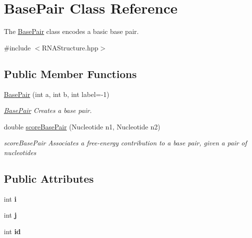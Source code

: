 \hypertarget{class_base_pair}{}\section{Base\+Pair Class Reference}
\label{class_base_pair}


The \hyperlink{class_base_pair}{Base\+Pair} class encodes a basic base pair.  




{\ttfamily \#include $<$R\+N\+A\+Structure.\+hpp$>$}

\subsection*{Public Member Functions}
\begin{DoxyCompactItemize}
\item 
\hyperlink{class_base_pair_ae11e048c14320d131209d1cc2f269420}{Base\+Pair} (int a, int b, int label=-\/1)
\begin{DoxyCompactList}\small\item\em \hyperlink{class_base_pair}{Base\+Pair} Creates a base pair. \end{DoxyCompactList}\item 
double \hyperlink{class_base_pair_a2f21c1f146b7dd0c164de88710cebde8}{score\+Base\+Pair} (Nucleotide n1, Nucleotide n2)
\begin{DoxyCompactList}\small\item\em score\+Base\+Pair Associates a free-\/energy contribution to a base pair, given a pair of nucleotides \end{DoxyCompactList}\end{DoxyCompactItemize}
\subsection*{Public Attributes}
\begin{DoxyCompactItemize}
\item 
\mbox{\label{class_base_pair_ab0fcfeaac816c4048a835a5c07246a10}} 
int {\bfseries i}
\item 
\mbox{\label{class_base_pair_a1e12cec106fade7bf9a9f5c3141dce67}} 
int {\bfseries j}
\item 
\mbox{\label{class_base_pair_a9235400f75562821977c2dbbd5ccaafc}} 
int {\bfseries id}
\end{DoxyCompactItemize}


